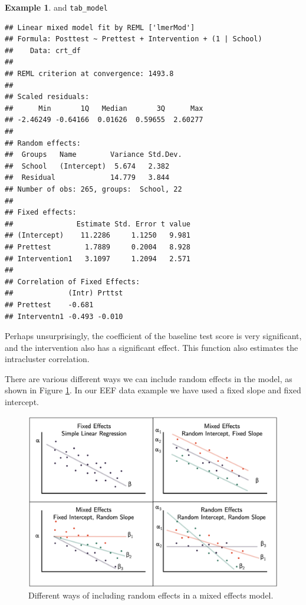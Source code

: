 \documentclass[
  openany]{book}
\theoremstyle{definition}
\theoremstyle{definition}
\newtheorem{example}{Example}[chapter]
\theoremstyle{definition}
\theoremstyle{definition}
\theoremstyle{remark}
\begin{document}
\begin{example}
and \texttt{tab\_model}

\begin{verbatim}
## Linear mixed model fit by REML ['lmerMod']
## Formula: Posttest ~ Prettest + Intervention + (1 | School)
##    Data: crt_df
## 
## REML criterion at convergence: 1493.8
## 
## Scaled residuals: 
##      Min       1Q   Median       3Q      Max 
## -2.46249 -0.64166  0.01626  0.59655  2.60277 
## 
## Random effects:
##  Groups   Name        Variance Std.Dev.
##  School   (Intercept)  5.674   2.382   
##  Residual             14.779   3.844   
## Number of obs: 265, groups:  School, 22
## 
## Fixed effects:
##               Estimate Std. Error t value
## (Intercept)    11.2286     1.1250   9.981
## Prettest        1.7889     0.2004   8.928
## Intervention1   3.1097     1.2094   2.571
## 
## Correlation of Fixed Effects:
##             (Intr) Prttst
## Prettest    -0.681       
## Interventn1 -0.493 -0.010
\end{verbatim}

Perhaps unsurprisingly, the coefficient of the baseline test score is very significant, and the intervention also has a significant effect. This function also estimates the intracluster correlation.
\end{example}

There are various different ways we can include random effects in the model, as shown in Figure \ref{fig:raneffmodels}. In our EEF data example we have used a fixed slope and fixed intercept.

\begin{figure}
\centering
\includegraphics{images/raneffmodels.png}
\caption{\label{fig:raneffmodels}Different ways of including random effects in a mixed effects model.}
\end{figure}
\end{document}
